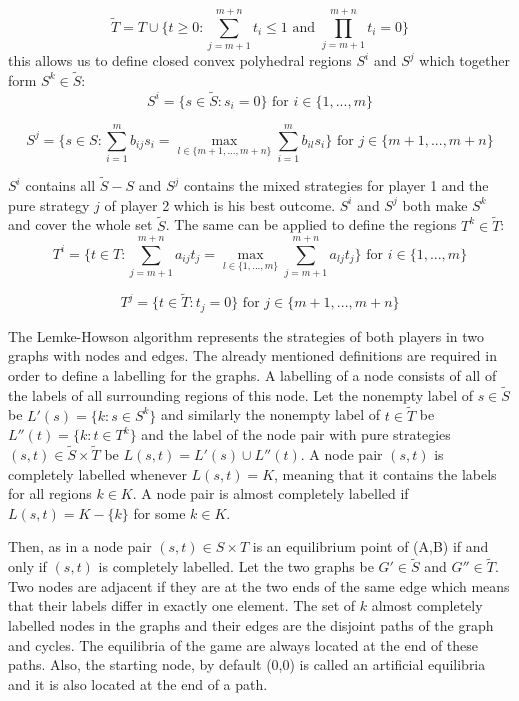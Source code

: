 {\begin{equation}
\tilde{T} = T \cup \{t \geq 0: \sum_{j=m+1}^{m+n} t_i \leq 1 \text{ and } \prod_{j=m+1}^{m+n} t_i = 0 \}
\end{equation}
this allows us to define closed convex polyhedral regions $S^i$ and $S^j$ which together form $S^k \in \tilde{S}$:
\begin{equation}
S^i = \{ s \in \tilde{S}: s_i = 0 \} \text{ for } i \in \{1,...,m\}
\end{equation}


\begin{equation}
S^j = \Big\{ s \in S: \sum_{i=1}^{m} b_{ij} s_i = \max_{l \in \{m+1,...,m+n\}} \sum_{i=1}^{m} b_{il} s_i \Big\} \text{ for } j \in \{m+1,...,m+n\}
\end{equation}


$S^i$ contains all $\tilde{S}-S$ and $S^j$ contains the mixed strategies for player 1 and the pure strategy $j$ of player 2 which is his best outcome. $S^i$ and $S^j$ both make $S^k$ and cover the whole set $\tilde{S}$. The same can be applied to define the regions $T^k \in \tilde{T}$:
\begin{equation} 
T^i = \Big\{ t \in T: \sum_{j=m+1}^{m+n} a_{ij} t_j = \max_{l \in \{1,...,m\}} \sum_{j=m+1}^{m+n} a_{lj} t_j \Big\} \text{ for } i \in \{1,...,m\} 
\end{equation}

\begin{equation}
T^j = \{ t \in \tilde{T}: t_j = 0 \} \text{ for } j \in \{m+1,...,m+n\} 
\end{equation}


The Lemke-Howson algorithm represents the strategies of both players in two graphs with nodes and edges. The already mentioned definitions are required in order to define a labelling for the graphs. A labelling of a node consists of all of the labels of all surrounding regions of this node. Let the nonempty label of $s \in \tilde{S}$ be $L'(s) = \{ k: s \in S^k \}$ and similarly the nonempty label of $t \in \tilde{T}$ be $L''(t) = \{ k: t \in T^k \}$ and the label of the node pair with pure strategies $(s,t) \in \tilde{S} \times \tilde{T}$ be $L(s,t) = L'(s) \cup L''(t)$. A node pair $(s,t)$ is completely labelled whenever $L(s,t) = K$, meaning that it contains the labels for all regions $k \in K$. A node pair is almost completely labelled if $L(s,t) = K - \{k\}$ for some $k \in K$. 

Then, as in \citet{shapley1974note} a node pair $(s,t) \in S \times T$ is an equilibrium point of (A,B) if and only if $(s,t)$ is completely labelled. Let the two graphs be $G' \in \tilde{S}$ and $G'' \in \tilde{T}$. Two nodes are adjacent if they are at the two ends of the same edge which means that their labels differ in exactly one element. The set of $k$ almost completely labelled nodes in the graphs and their edges are the disjoint paths of the graph and cycles. The equilibria of the game are always located at the end of these paths. Also, the starting node, by default (0,0) is called an artificial equilibria and it is also located at the end of a path.

}
